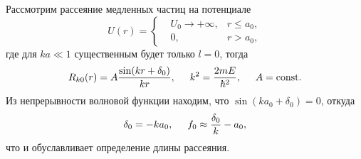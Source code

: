 
Рассмотрим рассеяние медленных частиц на потенциале
\begin{equation*}
	U(r) = \left\{\begin{aligned}
	    &U_0 \to + \infty, & r \leq a_0, \\
	    &0, &r > a_0,
	\end{aligned}\right.
\end{equation*}
где для $ka\ll 1$ существенным будет только $l=0$, тогда
\begin{equation*}
	R_{k0} (r) = A \frac{\sin (kr + \delta_0)}{kr},
	\hspace{5 mm} 
	k^2 = \frac{2 m E}{\hbar^2},
	\hspace{5 mm} 
	A = \textnormal{const}.
\end{equation*}
Из непрерывности волновой функции находим, что $\sin(k a_0 + \delta_0) = 0$, откуда
\begin{equation*}
	\delta_0 = - ka_0,
	\hspace{5 mm} 
	f_0 \approx \frac{\delta_0}{k} - a_0,
\end{equation*}
что и обуславливает определение длины рассеяния. 


